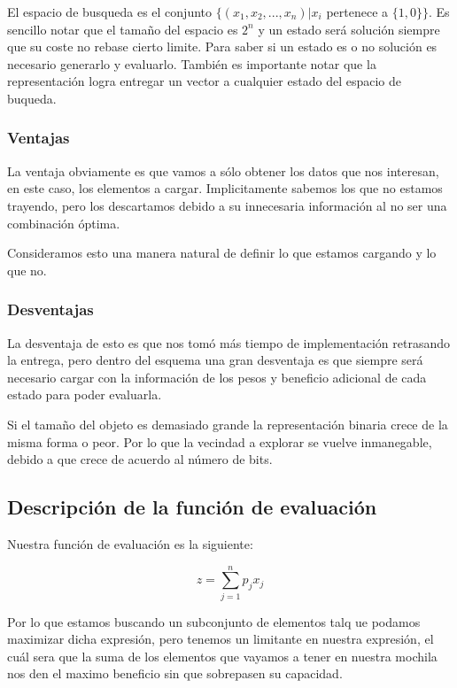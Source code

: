 \documentclass{article}
\begin{document}
	El espacio de busqueda es el conjunto $\{(x_1,x_2,..., x_n) | x_i$ pertenece a $\{1,0\}\}$. Es sencillo notar que el tamaño del espacio es $2^n$ y un estado será solución siempre
	que su coste no rebase cierto limite. Para saber si un estado es o no solución es necesario generarlo y evaluarlo. También es importante notar que la representación logra 
	entregar un vector a cualquier estado del espacio de buqueda.




\subsubsection*{Ventajas}
La ventaja obviamente es que vamos a sólo obtener los datos que nos interesan, en este caso, los elementos a cargar.
Implicitamente sabemos los que no estamos trayendo, pero los descartamos debido a su innecesaria información al no ser una combinación óptima.

Consideramos esto una manera natural de definir lo que estamos cargando y lo que no.

\subsubsection*{Desventajas}
La desventaja de esto es que nos tomó más tiempo de implementación retrasando la entrega, pero dentro del esquema una gran desventaja es que siempre será necesario cargar con la información de los pesos y beneficio adicional de cada estado para poder evaluarla.

Si el tamaño del objeto es demasiado grande la representación binaria crece de la misma forma o peor.
Por lo que la vecindad a explorar se vuelve inmanegable, debido a que crece de acuerdo al número de bits.

\subsection*{Descripción de la función de evaluación}
Nuestra función de evaluación es la siguiente:

\begin{equation*}
z = \sum_{j=1}^n p_jx_j
\end{equation*}

Por lo que estamos buscando un subconjunto de elementos talq ue podamos maximizar dicha expresión, pero tenemos un limitante en nuestra expresión, el cuál sera que la suma de los elementos que vayamos a tener en nuestra mochila nos den el maximo beneficio sin que sobrepasen su capacidad.
\end{document}
